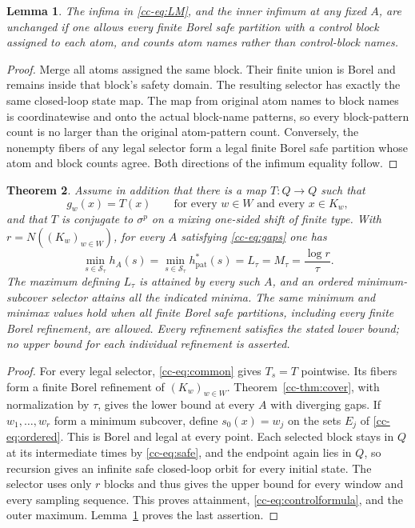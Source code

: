 \documentclass[11pt,reqno]{amsart}
\numberwithin{equation}{section}
\newtheorem{theorem}{Theorem}[section]
\newtheorem{lemma}[theorem]{Lemma}
\theoremstyle{definition}
\newcommand{\hpat}{h_{\mathrm{pat}}^{*}}
\newcommand{\Ssafe}{\mathcal S}
\begin{document}
\begin{lemma}\label{cc-lem:merge}
The infima in \eqref{cc-eq:LM}, and the inner infimum at any fixed $A$, are
unchanged if one allows every finite Borel safe partition with a
control block assigned to each atom, and counts atom names rather than
control-block names.
\end{lemma}
\begin{proof}
Merge all atoms assigned the same block. Their finite union is Borel
and remains inside that block's safety domain. The resulting selector
has exactly the same closed-loop state map. The map from original atom
names to block names is coordinatewise and onto the actual block-name
patterns, so every block-pattern count is no larger than the original
atom-pattern count. Conversely, the nonempty fibers of any legal
selector form a legal finite Borel safe partition whose atom and
block counts agree. Both directions of the infimum equality follow.
\end{proof}

\begin{theorem}\label{cc-thm:control}
Assume in addition that there is a map $T:Q\to Q$ such that
\begin{equation}\label{cc-eq:common}
 g_w(x)=T(x)\qquad\text{for every }w\in W\text{ and every }x\in K_w,
\end{equation}
and that $T$ is conjugate to $\sigma^p$ on a mixing one-sided shift of
finite type. With $r=N((K_w)_{w\in W})$, for every $A$ satisfying
\eqref{cc-eq:gaps} one has
\begin{equation}\label{cc-eq:controlformula}
 \min_{s\in\Ssafe_\tau}h_A(s)
 =\min_{s\in\Ssafe_\tau}\hpat(s)
 =L_\tau=M_\tau=\frac{\log r}{\tau}.
\end{equation}
The maximum defining $L_\tau$ is attained by every such $A$, and an
ordered minimum-subcover selector attains all the indicated minima.
The same minimum and minimax values hold when all finite Borel safe
partitions, including every finite Borel refinement, are allowed. Every
refinement satisfies the stated lower bound; no upper bound for each
individual refinement is asserted.
\end{theorem}
\begin{proof}
For every legal selector, \eqref{cc-eq:common} gives $T_s=T$ pointwise.
Its fibers form a finite Borel refinement of $(K_w)_{w\in W}$.
Theorem~\ref{cc-thm:cover}, with normalization by $\tau$, gives the lower
bound at every $A$ with diverging gaps. If $w_1,\ldots,w_r$ form a
minimum subcover, define $s_0(x)=w_j$ on the sets $E_j$ of
\eqref{cc-eq:ordered}. This is Borel and legal at every point. Each selected
block stays in $Q$ at its intermediate times by \eqref{cc-eq:safe}, and
the endpoint again lies in $Q$, so recursion gives an infinite safe
closed-loop orbit for every initial state. The selector uses only $r$
blocks and thus gives the upper bound for every window and every
sampling sequence. This proves attainment, \eqref{cc-eq:controlformula},
and the outer maximum. Lemma~\ref{cc-lem:merge} proves the last assertion.
\end{proof}
\end{document}
